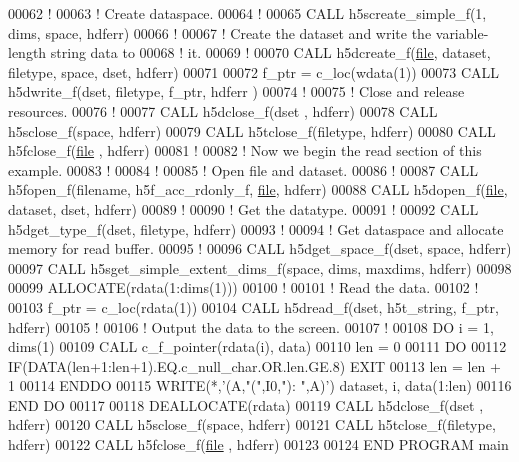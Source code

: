 \begin{DoxyCode}
00062   \textcolor{comment}{!}
00063   \textcolor{comment}{! Create dataspace.}
00064   \textcolor{comment}{!}
00065   \textcolor{keyword}{CALL }h5screate\_simple\_f(1, dims, space, hdferr)
00066   \textcolor{comment}{!}
00067   \textcolor{comment}{! Create the dataset and write the variable-length string data to}
00068   \textcolor{comment}{! it.}
00069   \textcolor{comment}{!}
00070   \textcolor{keyword}{CALL }h5dcreate\_f(\hyperlink{structfile}{file}, dataset, filetype, space, dset, hdferr)
00071 
00072   f\_ptr = c\_loc(wdata(1))
00073   \textcolor{keyword}{CALL }h5dwrite\_f(dset, filetype, f\_ptr, hdferr )
00074   \textcolor{comment}{!}
00075   \textcolor{comment}{! Close and release resources.}
00076   \textcolor{comment}{!}
00077   \textcolor{keyword}{CALL }h5dclose\_f(dset , hdferr)
00078   \textcolor{keyword}{CALL }h5sclose\_f(space, hdferr)
00079   \textcolor{keyword}{CALL }h5tclose\_f(filetype, hdferr)
00080   \textcolor{keyword}{CALL }h5fclose\_f(\hyperlink{structfile}{file} , hdferr)
00081   \textcolor{comment}{!}
00082   \textcolor{comment}{! Now we begin the read section of this example.}
00083   \textcolor{comment}{!}
00084   \textcolor{comment}{!}
00085   \textcolor{comment}{! Open file and dataset.}
00086   \textcolor{comment}{!}
00087   \textcolor{keyword}{CALL }h5fopen\_f(filename, h5f\_acc\_rdonly\_f, \hyperlink{structfile}{file}, hdferr)
00088   \textcolor{keyword}{CALL }h5dopen\_f(\hyperlink{structfile}{file}, dataset, dset, hdferr)
00089   \textcolor{comment}{!}
00090   \textcolor{comment}{! Get the datatype.}
00091   \textcolor{comment}{!}
00092   \textcolor{keyword}{CALL }h5dget\_type\_f(dset, filetype, hdferr)
00093   \textcolor{comment}{!}
00094   \textcolor{comment}{! Get dataspace and allocate memory for read buffer.}
00095   \textcolor{comment}{!}
00096   \textcolor{keyword}{CALL }h5dget\_space\_f(dset, space, hdferr)
00097   \textcolor{keyword}{CALL }h5sget\_simple\_extent\_dims\_f(space, dims, maxdims, hdferr)
00098 
00099   \textcolor{keyword}{ALLOCATE}(rdata(1:dims(1)))
00100   \textcolor{comment}{!}
00101   \textcolor{comment}{! Read the data.}
00102   \textcolor{comment}{!}
00103   f\_ptr = c\_loc(rdata(1))
00104   \textcolor{keyword}{CALL }h5dread\_f(dset, h5t\_string, f\_ptr, hdferr)
00105   \textcolor{comment}{!}
00106   \textcolor{comment}{! Output the data to the screen.}
00107   \textcolor{comment}{!}
00108   \textcolor{keywordflow}{DO} i = 1, dims(1)
00109      \textcolor{keyword}{CALL }c\_f\_pointer(rdata(i), data)
00110      len = 0
00111      \textcolor{keywordflow}{DO}
00112         \textcolor{keywordflow}{IF}(\textcolor{keyword}{DATA}(len+1:len+1).EQ.c\_null\_char.OR.len.GE.8) \textcolor{keywordflow}{EXIT}
00113         len = len + 1
00114 \textcolor{keywordflow}{     ENDDO}
00115      \textcolor{keyword}{WRITE}(*,\textcolor{stringliteral}{'(A,"(",I0,"): ",A)'}) dataset, i, \textcolor{keyword}{data}(1:len)
00116 \textcolor{keywordflow}{  END DO}
00117 
00118   \textcolor{keyword}{DEALLOCATE}(rdata)
00119   \textcolor{keyword}{CALL }h5dclose\_f(dset , hdferr)
00120   \textcolor{keyword}{CALL }h5sclose\_f(space, hdferr)
00121   \textcolor{keyword}{CALL }h5tclose\_f(filetype, hdferr)
00122   \textcolor{keyword}{CALL }h5fclose\_f(\hyperlink{structfile}{file} , hdferr)
00123 
00124 \textcolor{keyword}{END PROGRAM }main
\end{DoxyCode}
